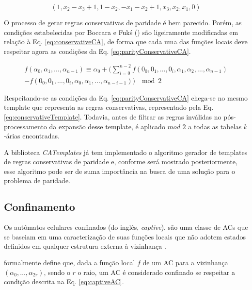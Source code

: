\begin{equation}
(1,x_2-x_3+1,1-x_2,-x_1-x_2+1,x_3,x_2,x_1,0)
\label{eq:conservativeTemplate}
\end{equation}

O processo de gerar regras conservativas de paridade é bem parecido. Porém, as condições estabelecidas por Boccara e Fukś (\citeyear{boccara2002}) são ligeiramente modificadas em relação à Eq. \eqref{eq:conservativeCA}, de forma que cada uma das funções locais deve respeitar agora as condições da Eq. \eqref{eq:parityConservativeCA}.

\begin{equation}
\begin{split}
f(\alpha_0,\alpha_1, \dots,\alpha_{n-1}) \equiv \alpha_0 + (\sum_{i=0}^{n-2}f(0_0,0_1, \dots,0_i,\alpha_1,\alpha_2, \dots,\alpha_{n-1}) \\- f(0_0,0_1, \dots,0_i,\alpha_0,\alpha_1, \dots,\alpha_{n-i-1})) \; \mod 2
\label{eq:parityConservativeCA}
\end{split}
\end{equation}

Respeitando-se as condições da Eq. \eqref{eq:parityConservativeCA} chega-se no mesmo template que representa as regras conservativas, representado pela Eq. \eqref{eq:conservativeTemplate}. Todavia, antes de filtrar as regras inválidas no pós-processamento da expansão desse template, é aplicado $mod$ $2$ a todas as tabelas $k$-árias encontradas. 

A biblioteca \textit{CATemplates} já tem implementado o algoritmo gerador de templates de regras conservativas de paridade e, conforme será mostrado posteriormente, esse algoritmo pode ser de suma importância na busca de uma solução para o problema de paridade.

\subsection{Confinamento}
Os autômatos celulares confinados (do inglês, \textit{captive}), são uma classe de ACs que se baseiam em uma caracterização de suas funções locais que não adotem estados definidos em qualquer estrutura externa à vizinhança \cite{theyssier2004captive}. 

 formalmente define que, dada a função local $f$ de um AC para a vizinhança $(\alpha_0, \dots, \alpha_{2r})$, sendo o $r$ o raio, um AC é considerado confinado se respeitar a condição descrita na Eq. \eqref{eq:captiveAC}.


